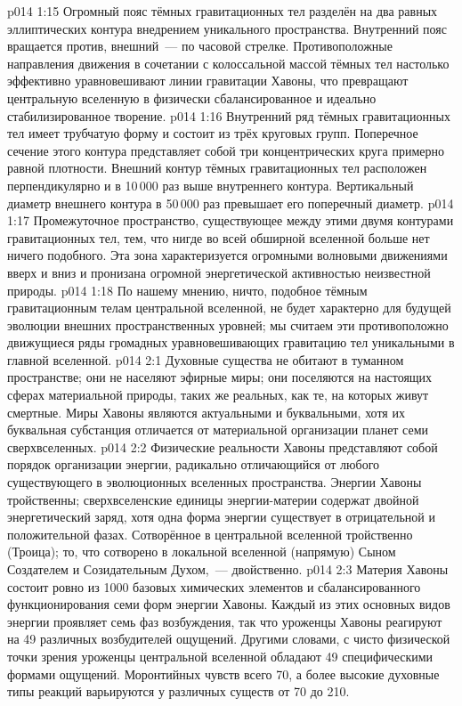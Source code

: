 \vs p014 1:15 Огромный пояс тёмных гравитационных тел разделён на два равных эллиптических контура внедрением уникального пространства. Внутренний пояс вращается против, внешний~--- по часовой стрелке. Противоположные направления движения в сочетании с колоссальной массой тёмных тел настолько эффективно уравновешивают линии гравитации Хавоны, что превращают центральную вселенную в физически сбалансированное и идеально стабилизированное творение.
\vs p014 1:16 Внутренний ряд тёмных гравитационных тел имеет трубчатую форму и состоит из трёх круговых групп. Поперечное сечение этого контура представляет собой три концентрических круга примерно равной плотности. Внешний контур тёмных гравитационных тел расположен перпендикулярно и в 10\,000 раз выше внутреннего контура. Вертикальный диаметр внешнего контура в 50\,000 раз превышает его поперечный диаметр.
\vs p014 1:17 Промежуточное пространство, существующее между этими двумя контурами гравитационных тел,  тем, что нигде во всей обширной вселенной больше нет ничего подобного. Эта зона характеризуется огромными волновыми движениями вверх и вниз и пронизана огромной энергетической активностью неизвестной природы.
\vs p014 1:18 По нашему мнению, ничто, подобное тёмным гравитационным телам центральной вселенной, не будет характерно для будущей эволюции внешних пространственных уровней; мы считаем эти противоположно движущиеся ряды громадных уравновешивающих гравитацию тел уникальными в главной вселенной.
\vs p014 2:1 Духовные существа не обитают в туманном пространстве; они не населяют эфирные миры; они поселяются на настоящих сферах материальной природы, таких же реальных, как те, на которых живут смертные. Миры Хавоны являются актуальными и буквальными, хотя их буквальная субстанция отличается от материальной организации планет семи сверхвселенных.
\vs p014 2:2 Физические реальности Хавоны представляют собой порядок организации энергии, радикально отличающийся от любого существующего в эволюционных вселенных пространства. Энергии Хавоны тройственны; сверхвселенские единицы энергии\hyp{}материи содержат двойной энергетический заряд, хотя одна форма энергии существует в отрицательной и положительной фазах. Сотворённое в центральной вселенной тройственно (Троица); то, что сотворено в локальной вселенной (напрямую) Сыном Создателем и Созидательным Духом,~--- двойственно.
\vs p014 2:3 Материя Хавоны состоит ровно из 1000 базовых химических элементов и сбалансированного функционирования семи форм энергии Хавоны. Каждый из этих основных видов энергии проявляет семь фаз возбуждения, так что уроженцы Хавоны реагируют на 49 различных возбудителей ощущений. Другими словами, с чисто физической точки зрения уроженцы центральной вселенной обладают 49 специфическими формами ощущений. Моронтийных чувств всего 70, а более высокие духовные типы реакций варьируются у различных существ от 70 до 210.
